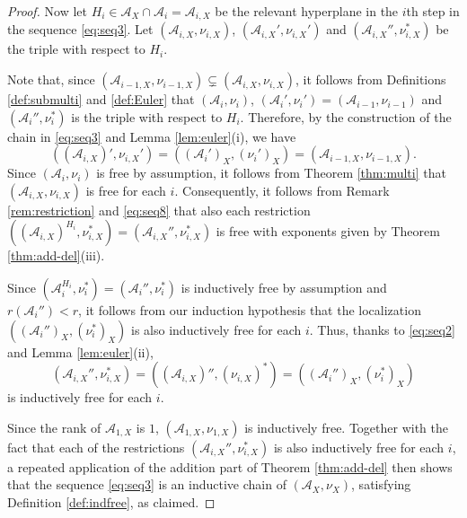 \begin{proof}
Now let $H_i \in {{\mathcal A}}_X \cap {{\mathcal A}}_i = {{\mathcal A}}_{i,X}$ be the relevant 
hyperplane in the $i$th step in the sequence \eqref{eq:seq3}.
Let $({{\mathcal A}}_{i,X}, \nu_{i,X})$, $({{\mathcal A}}_{i,X}', \nu_{i,X}')$
and $({{\mathcal A}}_{i,X}'', \nu_{i,X}^*)$
be the triple with respect to $H_i$.

Note that, since 
$({{\mathcal A}}_{i-1, X}, \nu_{i-1, X}) \subsetneq ({{\mathcal A}}_{i,X}, \nu_{i,X})$,
it follows from 
Definitions \ref{def:submulti} and \ref{def:Euler} that 
$({{\mathcal A}}_i, \nu_i)$, $({{\mathcal A}}_i', \nu_i') = ({{\mathcal A}}_{i-1}, \nu_{i-1})$
and $({{\mathcal A}}_i'', \nu_i^*)$
is the triple with respect to $H_i$.
Therefore, by the construction of the chain in \eqref{eq:seq3} and 
Lemma \ref{lem:euler}(i), we have 
\begin{equation}
\label{eq:seq8}
\left(\left({{\mathcal A}}_{i,X}\right)', \nu_{i,X}'\right) 
= \left(({{\mathcal A}}_i')_X, (\nu_i')_X\right) 
=  \left({{\mathcal A}}_{i-1, X}, \nu_{i-1, X}\right). 
\end{equation}
Since $({{\mathcal A}}_i, \nu_i)$ is free by assumption, it follows from 
Theorem \ref{thm:multi} that  $({{\mathcal A}}_{i,X}, \nu_{i,X})$ 
is free for each $i$. 
Consequently, it follows from
Remark \ref{rem:restriction} 
and \eqref{eq:seq8}
that also each restriction 
$(({{\mathcal A}}_{i,X})^{H_i}, \nu_{i,X}^*) = ({{\mathcal A}}_{i,X}'', \nu_{i,X}^*)$
is free with exponents given by Theorem \ref{thm:add-del}(iii).

Since $({{\mathcal A}}_i^{H_i}, \nu_i^*) = ({{\mathcal A}}_i'', \nu_i^*)$ 
is inductively free by assumption
and $r({{\mathcal A}}_i'') < r$, it follows from our induction hypothesis
that the localization 
$(({{\mathcal A}}_i'')_X, (\nu_{i}^*)_X)$ is also inductively
free for each $i$.
Thus, thanks to \eqref{eq:seq2} and Lemma \ref{lem:euler}(ii),
\[
({{\mathcal A}}_{i,X}'', \nu_{i,X}^*) = (({{\mathcal A}}_{i,X})'', (\nu_{i,X})^*) 
= (({{\mathcal A}}_i'')_X, (\nu_{i}^*)_X)
\] 
is inductively free for each $i$.

Since the rank of ${{\mathcal A}}_{1,X}$ is $1$, 
$({{\mathcal A}}_{1,X}, \nu_{1,X})$ 
is inductively free.
Together with the fact that each of the restrictions 
$({{\mathcal A}}_{i,X}'', \nu_{i,X}^*)$
is also inductively
free for each $i$, a repeated application of the 
addition part of Theorem \ref{thm:add-del} then
shows that  the sequence \eqref{eq:seq3}
is an inductive chain 
of $({{\mathcal A}}_X, \nu_X)$, satisfying Definition \ref{def:indfree},
as claimed.


\end{proof}
